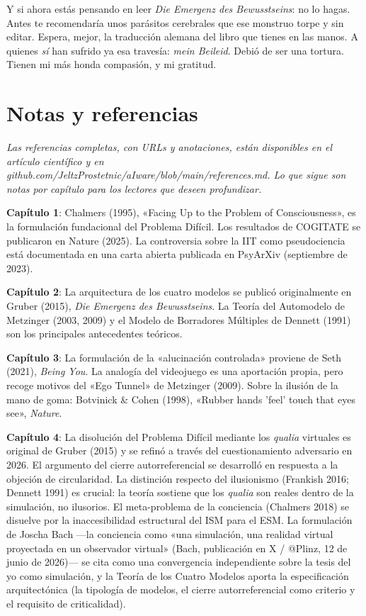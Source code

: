 \documentclass[11pt, twoside, openright]{book}
\begin{document}
Y si ahora estás pensando en leer \textit{Die Emergenz des Bewusstseins}: no lo hagas. Antes te recomendaría unos parásitos cerebrales que ese monstruo torpe y sin editar. Espera, mejor, la traducción alemana del libro que tienes en las manos. A quienes \textit{sí} han sufrido ya esa travesía: \textit{mein Beileid}. Debió de ser una tortura. Tienen mi más honda compasión, y mi gratitud.


\chapter*{Notas y referencias}

\textit{Las referencias completas, con URLs y anotaciones, están disponibles en el artículo científico y en github.com/\allowbreak{}JeltzProstetnic/\allowbreak{}aIware/\allowbreak{}blob/\allowbreak{}main/\allowbreak{}references.md. Lo que sigue son notas por capítulo para los lectores que deseen profundizar.}

\textbf{Capítulo 1}: Chalmers (1995), «Facing Up to the Problem of Consciousness», es la formulación fundacional del Problema Difícil. Los resultados de COGITATE se publicaron en Nature (2025). La controversia sobre la IIT como pseudociencia está documentada en una carta abierta publicada en PsyArXiv (septiembre de 2023).

\textbf{Capítulo 2}: La arquitectura de los cuatro modelos se publicó originalmente en Gruber (2015), \textit{Die Emergenz des Bewusstseins}. La Teoría del Automodelo de Metzinger (2003, 2009) y el Modelo de Borradores Múltiples de Dennett (1991) son los principales antecedentes teóricos.

\textbf{Capítulo 3}: La formulación de la «alucinación controlada» proviene de Seth (2021), \textit{Being You}. La analogía del videojuego es una aportación propia, pero recoge motivos del «Ego Tunnel» de Metzinger (2009). Sobre la ilusión de la mano de goma: Botvinick \& Cohen (1998), «Rubber hands 'feel' touch that eyes see», \textit{Nature}.

\textbf{Capítulo 4}: La disolución del Problema Difícil mediante los \textit{qualia} virtuales es original de Gruber (2015) y se refinó a través del cuestionamiento adversario en 2026. El argumento del cierre autorreferencial se desarrolló en respuesta a la objeción de circularidad. La distinción respecto del ilusionismo (Frankish 2016; Dennett 1991) es crucial: la teoría sostiene que los \textit{qualia} son reales dentro de la simulación, no ilusorios. El meta-problema de la conciencia (Chalmers 2018) se disuelve por la inaccesibilidad estructural del ISM para el ESM. La formulación de Joscha Bach ---la conciencia como «una simulación, una realidad virtual proyectada en un observador virtual» (Bach, publicación en X / @Plinz, 12 de junio de 2026)--- se cita como una convergencia independiente sobre la tesis del yo como simulación, y la Teoría de los Cuatro Modelos aporta la especificación arquitectónica (la tipología de modelos, el cierre autorreferencial como criterio y el requisito de criticalidad).
\end{document}
